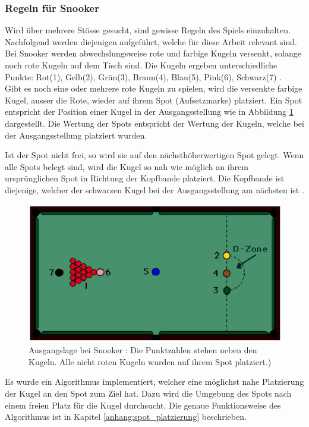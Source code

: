 \subsubsection{Regeln für Snooker}\label{kap:tiefensuche:regeln_fuer_snooker}
Wird über mehrere Stösse gesucht, sind gewisse Regeln des Spiels einzuhalten.
Nachfolgend werden diejenigen aufgeführt, welche für diese Arbeit relevant sind.
Bei Snooker werden abwechslungsweise rote und farbige Kugeln versenkt, solange noch rote Kugeln auf dem Tisch sind.
Die Kugeln ergeben unterschiedliche Punkte: Rot(1), Gelb(2), Grün(3), Braun(4), Blau(5), Pink(6), Schwarz(7) \cite{stoppball:spielregel:snooker}.\\
Gibt es noch eine oder mehrere rote Kugeln zu spielen, wird die versenkte farbige Kugel, ausser die Rote, wieder
auf ihrem Spot (Aufsetzmarke) platziert.
Ein Spot entspricht der Position einer Kugel in der Ausgangsstellung wie in Abbildung \ref{fig:snooker_ausgangslage} dargestellt.
Die Wertung der Spots entspricht der Wertung der Kugeln, welche bei der Ausgangsstellung platziert wurden.

Ist der Spot nicht frei, so wird sie auf den nächsthöherwertigen Spot gelegt.
Wenn alle Spots belegt sind, wird die Kugel so nah wie möglich an ihrem ursprünglichen Spot in Richtung der Kopfbande platziert.
Die Kopfbande ist diejenige, welcher der schwarzen Kugel bei der Ausgangsstellung am nächsten ist \cite{stoppball:spielregel:snooker}.

\begin{figure}[h!]
    \begin{center}
        \includegraphics[width=0.4\linewidth]{../common/03_billiard_ai/resources/39_snooker_ausgangslage.png}
    \end{center}
    \caption{Ausgangslage bei Snooker \cite{stoppball:spielregel:snooker}:
    Die Punktzahlen stehen neben den Kugeln.
    Alle nicht roten Kugeln wurden auf ihrem Spot platziert.)
    }
    \label{fig:snooker_ausgangslage}
\end{figure}

Es wurde ein Algorithmus implementiert, welcher eine möglichst nahe Platzierung der Kugel an den Spot zum Ziel hat.
Dazu wird die Umgebung des Spots nach einem freien Platz für die Kugel durchsucht.
Die genaue Funktionsweise des Algorithmus ist in Kapitel \ref{anhang:spot_platzierung} beschrieben.
